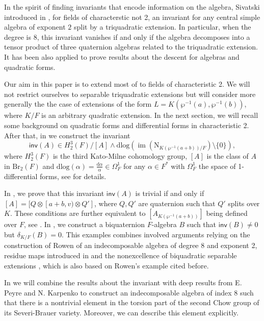 \documentclass{amsart}
\numberwithin{equation}{section}
\newcommand{\im}{\operatorname{im}}
\newcommand{\BrTwo}{\mathrm{Br}_2}
\newcommand{\quat}[1]{[#1)}
\newcommand{\norm}{\mathrm{N}}
\newcommand{\diff}{\mathrm{d}}
\newcommand{\dlog}{\mathrm{dlog}}
\newcommand{\inv}{\mathsf{inv}}
\begin{document}
In the spirit of finding invariants that encode information on the algebra, Sivatski introduced in \cite{Sivatski_CohoInv}, for fields of characterstic not 2, an invariant for any central simple algebra of exponent $2$ split by a triquadratic extension.
In particular, when the degree is $8$, this invariant vanishes if and only if the algebra decomposes into a tensor product of three quaternion algebras related to the triquadratic extension.
It has been also applied to prove results about the descent for algebras and quadratic forms. 

Our aim in this paper is to extend most of \cite{Sivatski_CohoInv} to fields of characteristic 2.
We will not restrict ourselves to separable triquadratic extensions but will consider more generally the the case of extensions of the form $L = K(\wp^{-1}(a), \wp^{-1}(b))$, where $K/F$ is an arbitrary quadratic extension.
In the next section, we will recall some background on quadratic forms and differential forms in characteristic 2.
After that, in  we construct the invariant 
\[\inv(A) \in H_2^3(F) / [A] \wedge \dlog(\im(\norm_{K(\wp^{-1}(a + b)) / F})\setminus \{0\}),\]
where $H_2^3(F)$ is the third Kato-Milne cohomology group, $[A]$ is the class of $A$ in $\BrTwo(F)$ and $\dlog(\alpha) = \frac{\diff \alpha}{\alpha} \in \Omega^1_F$ for any $\alpha \in F^\ast$ with $\Omega^1_F$ the space of 1-differential forms, see  for details.

In , we prove that this invariant $\inv(A)$ is trivial if and only if $[A] = [Q \otimes \quat{a+b, v} \otimes Q']$, where $Q, Q'$ are quaternion such that $Q'$ splits over $K$.
These conditions are further equivalent to $[A_{K(\wp^{-1}(a + b))}]$ being defined over $F$, see .
In , we construct a biquaternion $F$-algebra $B$ such that $\inv(B) \neq 0$ but $\delta_{K/F} (B) = 0$.
This examples combines involved arguments relying on the construction of Rowen of an indecomposable algebra of degree 8 and exponent 2, residue maps introduced in \cite[Proposition 6.3]{BarryChapmanLaghribi_DescentBiquaternion} and the nonexcellence of biquadratic separable extensions \cite[Example 6.1]{LaghribiMukhija_ExcellenceInsepQuartic}, which is also based on Rowen's example cited before.

In  we will combine the results about the invariant with deep results from E. Peyre and N. Karpenko to construct an indecomposable algebra of index $8$ such that there is a nontrivial element in the torsion part of the second Chow group of its Severi-Brauer variety. 
Moreover, we can describe this element explicitly.
\end{document}
